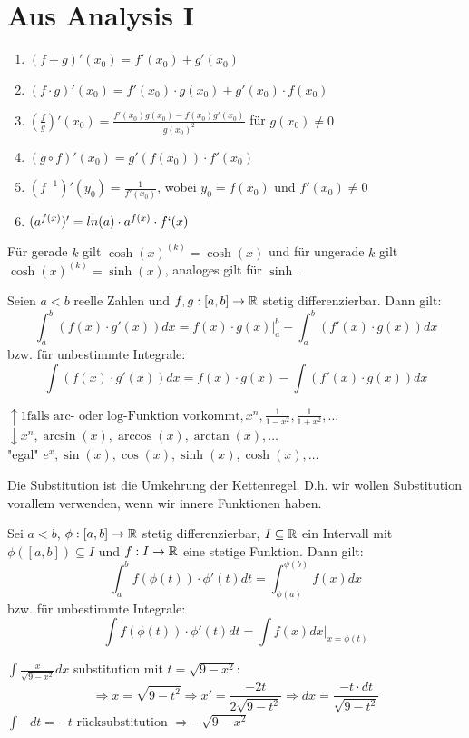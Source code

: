 \section{Aus Analysis I}



\begin{enumerate}[label = (\arabic*)]
    \item $(f + g)'(x_0) = f'(x_0) + g'(x_0)$
    \item $(f \cdot g)'(x_0) = f'(x_0) \cdot g(x_0) + g'(x_0) \cdot f(x_0)$
    \item $(\frac{f}{g})'(x_0) = \frac{f'(x_0)g(x_0) - f(x_0)g'(x_0)}{g(x_0)^2}$ für $g(x_0) \neq 0$
    \item $(g \circ f)'(x_0) = g'(f(x_0)) \cdot f'(x_0)$
    \item $(f^{-1})'(y_0) = \frac{1}{f'(x_0)}$, wobei $y_0 = f(x_0)$ und $f'(x_0) \neq 0$
    \item $(a^{f(x)})' = ln(a)\cdot a^{f(x)} \cdot f`(x)$
\end{enumerate}

\Bem Für gerade $k$ gilt $\cosh(x)^{(k)} = \cosh(x)$ und für ungerade $k$ gilt $\cosh(x)^{(k)} = \sinh(x)$,
analoges gilt für $\sinh$.



\begin{tcolorbox}
    Seien $a<b$ reelle Zahlen und $f,g : [a,b] \to \mathbb{R}$ stetig differenzierbar. Dann gilt:
    $$\int_a^b (f(x) \cdot g'(x))dx = f(x) \cdot g(x)\Big|_a^b - \int_a^b(f'(x)\cdot g(x))dx$$
    bzw. für unbestimmte Integrale:
    $$\int (f(x) \cdot g'(x))dx = f(x) \cdot g(x) - \int(f'(x)\cdot g(x))dx$$
\end{tcolorbox}

$\uparrow 1 \text{falls arc- oder log-Funktion vorkommt}, x^n, \frac{1}{1-x^2}, \frac{1}{1 + x^2}, \dots$ \\ \smallskip
$\downarrow x^n, \arcsin(x), \arccos(x), \arctan(x), \dots$ \\ \smallskip
"egal" $e^x, \sin(x), \cos(x), \sinh(x), \cosh(x), \dots$



Die Substitution ist die Umkehrung der Kettenregel. D.h. wir wollen Substitution vorallem verwenden,
wenn wir innere Funktionen haben.

\begin{tcolorbox}
    Sei $a < b$, $\phi : [a,b] \to \mathbb{R}$ stetig differenzierbar, $I \subseteq \mathbb{R}$ ein Intervall mit 
    $\phi([a,b]) \subseteq I$ und $f : I \to \mathbb{R}$ eine stetige Funktion. Dann gilt:
    $$\int_a^b f(\phi(t)) \cdot \phi'(t)dt = \int_{\phi(a)}^{\phi(b)}f(x)dx$$
    bzw. für unbestimmte Integrale:
    $$\int f(\phi(t)) \cdot \phi'(t)dt = \int f(x)dx \Big|_{x = \phi(t)}$$
\end{tcolorbox}

\Bsp $\int \frac{x}{\sqrt{9 - x^2}}dx$ substitution mit $t = \sqrt{9 - x^2}$:
$$\Rightarrow x = \sqrt{9 - t^2} \Rightarrow x' = \frac{-2t}{2 \sqrt{9 - t^2}} \Rightarrow dx = \frac{-t \cdot dt}{\sqrt{9 - t^2}}$$
$\int -dt = -t \text{ rücksubstitution } \Rightarrow - \sqrt{9 - x^2}$


\vfill\null
\columnbreak
